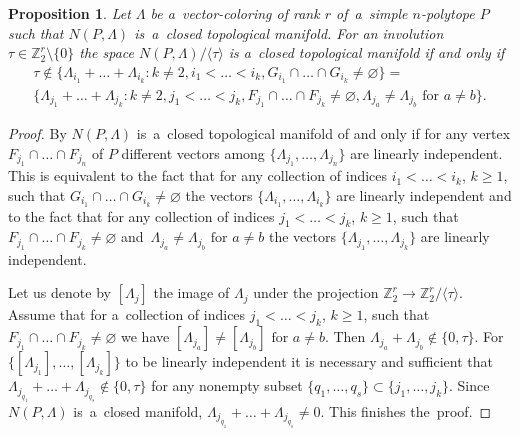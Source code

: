 \documentclass[12pt]{amsart}
\newtheorem{proposition}[formula]{Proposition}
\theoremstyle{definition}
\theoremstyle{remark}
\begin{document}
\begin{proposition} \label{prop:Plman}
Let $\Lambda$ be a~vector-coloring of rank $r$ of~a~simple $n$-polytope $P$ such that $N(P,\Lambda)$
is~a~closed topological manifold. For an involution $\tau\in \mathbb Z_2^r\setminus\{0\}$ 
the space $N(P,\Lambda)/\langle \tau\rangle$ is a~closed topological manifold if and only if 
\begin{gather*}
\tau\notin 
\{\Lambda_{i_1}+\dots+\Lambda_{i_k}\colon k\ne 2, i_1<\dots<i_k, G_{i_1}\cap \dots\cap G_{i_k}\ne\varnothing\}=\\ 
\{\Lambda_{j_1}+\dots+\Lambda_{j_k}\colon k\ne 2, j_1<\dots<j_k, F_{j_1}\cap \dots\cap F_{j_k}\ne\varnothing, 
\Lambda_{j_a}\ne \Lambda_{j_b} \text{ for $a\ne b$}\}.
\end{gather*}
\end{proposition}
\begin{proof}
By \cite[Theorem 5.1]{E24}  $N(P,\Lambda)$ is~a~closed topological manifold of and only if for any
vertex $F_{j_1}\cap\dots\cap F_{j_n}$ of $P$ different vectors among $\{\Lambda_{j_1},\dots,\Lambda_{j_n}\}$
are linearly independent. This is equivalent to the fact that for any collection of indices $i_1<\dots<i_k$, $k\geqslant 1$, 
such that $G_{i_1}\cap \dots\cap G_{i_k}\ne\varnothing$ the vectors $\{\Lambda_{i_1},\dots, \Lambda_{i_k}\}$
are linearly independent and to the fact that for any collection of indices $j_1<\dots<j_k$, $k\geqslant 1$, 
such that $F_{j_1}\cap \dots\cap F_{j_k}\ne\varnothing$  and~$\Lambda_{j_a}\ne \Lambda_{j_b} \text{ for $a\ne b$}$ 
the vectors $\{\Lambda_{j_1},\dots, \Lambda_{j_k}\}$
are linearly independent. 

Let us denote by $[\Lambda_j]$ the image of $\Lambda_j$ under the projection 
$\mathbb Z_2^r\to\mathbb Z_2^r/\langle\tau\rangle$. Assume that for a~collection of indices $j_1<\dots<j_k$, $k\geqslant 1$, 
such that $F_{j_1}\cap \dots\cap F_{j_k}\ne\varnothing$  we have $[\Lambda_{j_a}]\ne [\Lambda_{j_b}] \text{ for $a\ne b$}$. 
Then $\Lambda_{j_a}+\Lambda_{j_b}\notin \{0,\tau\}$. For $\{[\Lambda_{j_1}],\dots, [\Lambda_{j_k}]\}$ to be linearly 
independent it is necessary and sufficient that $\Lambda_{j_{q_1}}+\dots+\Lambda_{j_{q_s}}\notin\{0,\tau\}$
for any nonempty subset $\{q_1,\dots, q_s\}\subset\{j_1,\dots,j_k\}$. Since $N(P,\Lambda)$ is~a~closed manifold,
$\Lambda_{j_{q_1}}+\dots+\Lambda_{j_{q_s}}\ne 0$. This finishes the~proof.
\end{proof}
\end{document}

